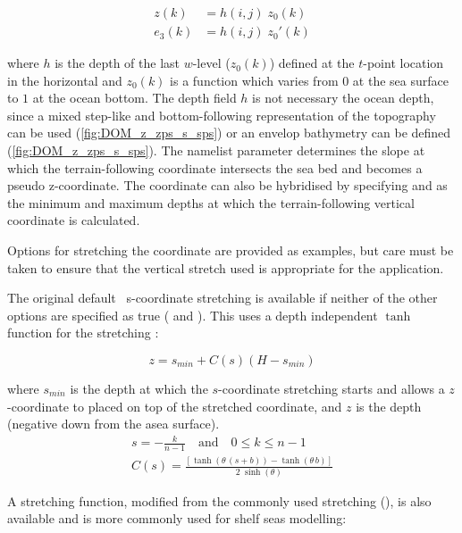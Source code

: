 \documentclass[../main/NEMO_manual]{subfiles}
\begin{document}
\begin{align*}
  z(k)   &= h(i,j) \; z_0 (k) \\
  e_3(k) &= h(i,j) \; z_0'(k)
\end{align*}

where $h$ is the depth of the last $w$-level ($z_0(k)$) defined at the $t$-point location in the horizontal and
$z_0(k)$ is a function which varies from $0$ at the sea surface to $1$ at the ocean bottom.
The depth field $h$ is not necessary the ocean depth,
since a mixed step-like and bottom-following representation of the topography can be used
(\autoref{fig:DOM_z_zps_s_sps}) or an envelop bathymetry can be defined (\autoref{fig:DOM_z_zps_s_sps}).
The namelist parameter  determines the slope at which
the terrain-following coordinate intersects the sea bed and becomes a pseudo z-coordinate.
The coordinate can also be hybridised by specifying  and  as
the minimum and maximum depths at which the terrain-following vertical coordinate is calculated.

Options for stretching the coordinate are provided as examples,
but care must be taken to ensure that the vertical stretch used is appropriate for the application.

The original default \NEMO\ s-coordinate stretching is available if neither of the other options are specified as true
( and ).
This uses a depth independent $\tanh$ function for the stretching \citep{madec.delecluse.ea_JPO96}:

\[
  z = s_{min} + C (s) (H - s_{min})
\]

where $s_{min}$ is the depth at which the $s$-coordinate stretching starts and
allows a $z$-coordinate to placed on top of the stretched coordinate,
and $z$ is the depth (negative down from the asea surface).
\begin{gather*}
  s = - \frac{k}{n - 1} \quad \text{and} \quad 0 \leq k \leq n - 1
 \\
 \label{eq:DOMCFG_sco_function}
  C(s) = \frac{[\tanh(\theta \, (s + b)) - \tanh(\theta \, b)]}{2 \; \sinh(\theta)}
\end{gather*}

A stretching function,
modified from the commonly used \citet{song.haidvogel_JCP94} stretching (),
is also available and is more commonly used for shelf seas modelling:
\end{document}
